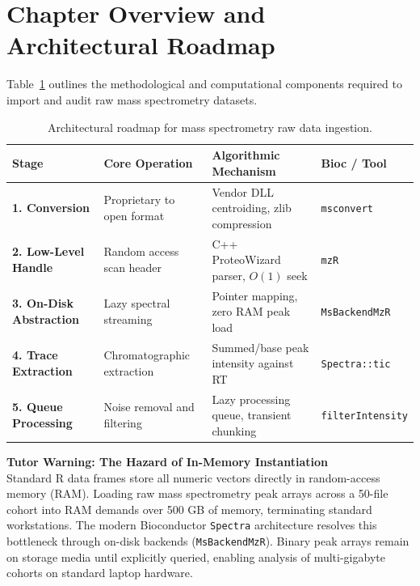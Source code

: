 \documentclass[11pt,twoside,openright]{book}
\begin{document}
\vspace{1em}
\section*{Chapter Overview and Architectural Roadmap}

Table~\ref{tab:ingestion_roadmap} outlines the methodological and computational components required to import and audit raw mass spectrometry datasets.

\begin{table}[htbp]
\centering
\caption{Architectural roadmap for mass spectrometry raw data ingestion.}
\label{tab:ingestion_roadmap}
\small
\begin{tabularx}{\textwidth}{l p{4.2cm} X l}
\toprule
\textbf{Stage} & \textbf{Core Operation} & \textbf{Algorithmic Mechanism} & \textbf{Bioc / Tool} \\
\midrule
\textbf{1. Conversion} & Proprietary to open format \cite{martens2011mzml} & Vendor DLL centroiding, zlib compression & \texttt{msconvert} \cite{chambers2012proteowizard} \\
\addlinespace
\textbf{2. Low-Level Handle} & Random access scan header & C++ ProteoWizard parser, $O(1)$ seek \cite{eddelbuettel2011rcpp} & \texttt{mzR} \\
\addlinespace
\textbf{3. On-Disk Abstraction} & Lazy spectral streaming & Pointer mapping, zero RAM peak load \cite{bhamber2021mzmlb} & \texttt{MsBackendMzR} \cite{gatto2021spectra} \\
\addlinespace
\textbf{4. Trace Extraction} & Chromatographic extraction & Summed/base peak intensity against RT & \texttt{Spectra::tic} \cite{rainer2022msexperiment} \\
\addlinespace
\textbf{5. Queue Processing} & Noise removal and filtering & Lazy processing queue, transient chunking & \texttt{filterIntensity} \cite{gatto2012msnbase} \\
\bottomrule
\end{tabularx}
\end{table}

\begin{notebox}
\textbf{Tutor Warning: The Hazard of In-Memory Instantiation}\\[0.4em]
Standard R data frames store all numeric vectors directly in random-access memory (RAM). Loading raw mass spectrometry peak arrays across a 50-file cohort into RAM demands over 500 GB of memory, terminating standard workstations. The modern Bioconductor \texttt{Spectra} architecture resolves this bottleneck through on-disk backends (\texttt{MsBackendMzR}). Binary peak arrays remain on storage media until explicitly queried, enabling analysis of multi-gigabyte cohorts on standard laptop hardware.
\end{notebox}
\end{document}
